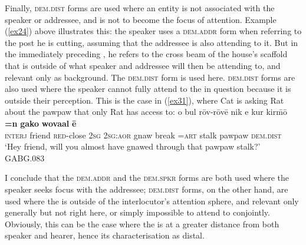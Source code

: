 \documentclass[output=paper
,modfonts
,nonflat]{langsci/langscibook}
\begin{document}
Finally, \textsc{dem.dist} forms are used where an entity is not associated with the speaker or addressee, and is not to become the focus of attention. Example (\ref{ex24}) above illustrates this: the speaker uses a \textsc{dem.addr} form when referring to the post he is cutting, assuming that the addressee is also attending to it. But in the immediately preceding , he refers to the cross beam of the house's scaffold that is outside of what speaker and addressee will then be attending to, and relevant only as background. The \textsc{dem.dist} form is used here. \textsc{dem.dist} forms are also used where the speaker cannot fully attend to the  in question because it is outside their perception. This is the case in (\ref{ex31}), where Cat is asking Rat about the pawpaw that only Rat has access to:
\ea	\label{ex31}
\gll		o 			bul 		r\=ov-r\=ov{\textquotesingle}\=e 	nik	e 			kur 		kir\=m\=o \textbf{=n}		\textbf{gako} 	\textbf{wova{\textquotesingle}al} \textbf{\=e}	\\
\textsc{interj}	friend		\textsc{red-}close	\textsc{2sg}	\textsc{2sg:aor}	gnaw		break		\textsc{=art}	stalk		pawpaw		\textsc{dem.dist}		\\
\glt	`Hey friend, will you almost have gnawed through that pawpaw stalk?'\\		\hfill{GABG.083}
\z

\noindent
I conclude that the \textsc{dem.addr} and the \textsc{dem.spkr} forms are both used where the speaker seeks  focus with the addressee; \textsc{dem.dist} forms, on the other hand, are used where the  is outside of the interlocutor's attention sphere, and relevant only generally but not right here, or simply impossible to attend to conjointly. Obviously, this can be the case where the  is at a greater distance from both speaker and hearer, hence its characterisation as distal.
\end{document}
